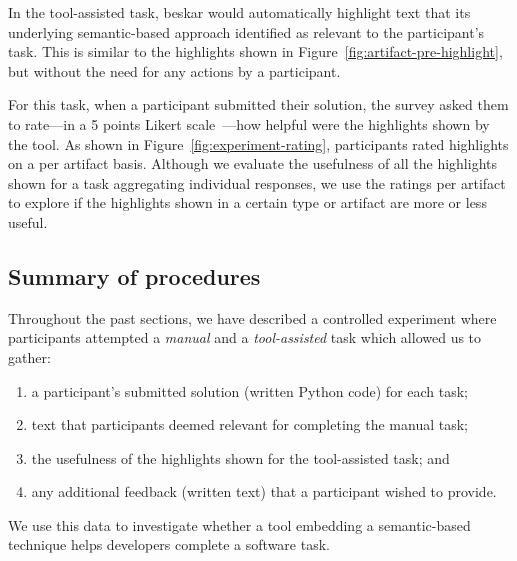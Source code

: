 In the tool-assisted task, \acs{beskar} would automatically highlight text that 
its underlying semantic-based approach identified as relevant to the participant's task.
This is similar to the highlights shown in Figure~\ref{fig:artifact-pre-highlight}, but without the need for any actions by a participant.




For this task, when a participant submitted their solution, the survey asked them to 
rate---in a 5 points Likert scale~\cite{likert1932technique}---how helpful were the highlights shown by the tool.
As shown in Figure~\ref{fig:experiment-rating}, participants rated highlights on a per artifact basis. Although we evaluate the usefulness of all the highlights shown for a task
aggregating individual responses, we use the ratings per artifact to explore if the highlights shown in a certain type or artifact are more or less useful.






\subsection{Summary of procedures}



Throughout the past sections, we have described a controlled experiment 
where participants attempted a \textit{manual} and a \textit{tool-assisted}
task which allowed us to gather:


\begin{enumerate}
\item a participant's submitted solution (written Python code) for each task;
\item text that participants deemed relevant for completing the manual task;
\item the usefulness of the highlights shown for the tool-assisted task; and
\item any additional feedback (written text) that a participant wished to provide.
\end{enumerate}


We use this data to investigate whether 
a tool embedding a semantic-based technique helps developers complete a software task. 


\clearpage


